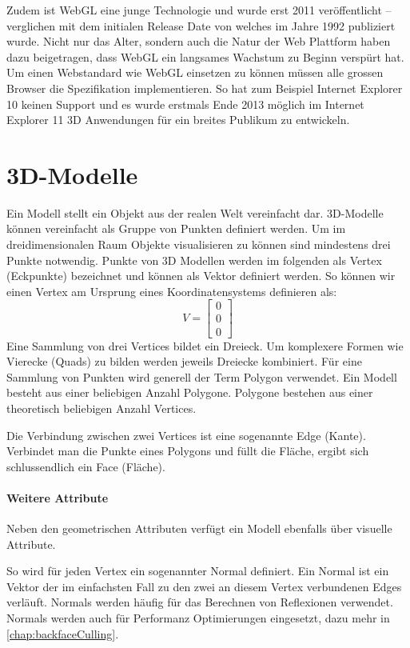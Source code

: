 Zudem ist WebGL eine junge Technologie und wurde erst 2011 veröffentlicht – verglichen mit dem initialen Release Date von  welches im Jahre 1992 publiziert wurde. \cite{webGl1Spec,openGlSpec}
Nicht nur das Alter, sondern auch die Natur der Web Plattform haben dazu beigetragen, dass WebGL ein langsames Wachstum zu Beginn verspürt hat. Um einen Webstandard wie WebGL einsetzen zu können müssen alle grossen Browser die Spezifikation implementieren. So hat zum Beispiel Internet Explorer 10 keinen Support und es wurde erstmals Ende 2013 möglich im Internet Explorer 11 3D Anwendungen für ein breites Publikum zu entwickeln.

\section{3D-Modelle}
Ein Modell stellt ein Objekt aus der realen Welt vereinfacht dar.
3D-Modelle können vereinfacht als Gruppe von Punkten definiert werden.
Um im dreidimensionalen Raum Objekte visualisieren zu können sind mindestens drei Punkte notwendig.
Punkte von 3D Modellen werden im folgenden als Vertex (Eckpunkte) bezeichnet und können als Vektor definiert werden.
So können wir einen Vertex am Ursprung eines Koordinatensystems definieren als:
$$ V =
\begin{bmatrix}
  0 \\
  0 \\
  0
\end{bmatrix}
$$
Eine Sammlung von drei Vertices bildet ein Dreieck. Um komplexere Formen wie Vierecke (Quads) zu bilden werden jeweils Dreiecke kombiniert.
Für eine Sammlung von Punkten wird generell der Term Polygon verwendet.
Ein Modell besteht aus einer beliebigen Anzahl Polygone.
Polygone bestehen aus einer theoretisch beliebigen Anzahl Vertices.

Die Verbindung zwischen zwei Vertices ist eine sogenannte Edge (Kante).
Verbindet man die Punkte eines Polygons und füllt die Fläche, ergibt sich schlussendlich ein Face (Fläche).

\paragraph{Weitere Attribute}
Neben den geometrischen Attributen verfügt ein Modell ebenfalls über visuelle Attribute.

So wird für jeden Vertex ein sogenannter Normal definiert. Ein Normal ist ein Vektor der im einfachsten Fall  zu den zwei an diesem Vertex verbundenen Edges verläuft. Normals werden häufig für das Berechnen von Reflexionen verwendet.
Normals werden auch für Performanz Optimierungen eingesetzt, dazu mehr in \autoref{chap:backfaceCulling}.

